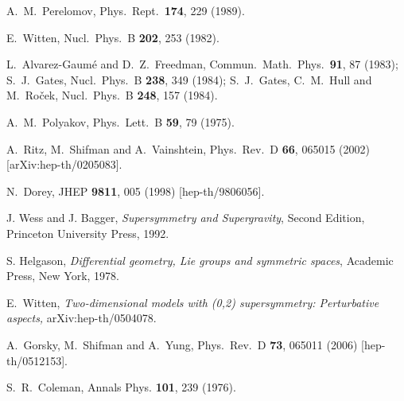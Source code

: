 \documentclass[epsfig,12pt]{article}
\newcommand{\cpn}{CP$(N-1)\,$}
\begin{document}
{\begin{thebibliography}{99}
 A.~M.~Perelomov,
  Phys.\ Rept.\  {\bf 174}, 229 (1989).
  
  E.~Witten,
  Nucl.\ Phys.\  B {\bf 202}, 253 (1982).
  
 L.~Alvarez-Gaum\'{e} and D.~Z.~Freedman,
Commun.\ Math.\ Phys.\  {\bf 91}, 87 (1983);
S.~J.~Gates,
Nucl.\ Phys.\ B {\bf 238}, 349 (1984);
S.~J.~Gates, C.~M.~Hull and M.~Ro\v{c}ek,
Nucl.\ Phys.\ B {\bf 248}, 157 (1984).

 A.~M.~Polyakov,
  Phys.\ Lett.\  B {\bf 59}, 79 (1975).
  
  A.~Ritz, M.~Shifman and A.~Vainshtein,
  Phys.\ Rev.\  D {\bf 66}, 065015 (2002)
  [arXiv:hep-th/0205083].
  
N.~Dorey,
JHEP {\bf 9811}, 005 (1998) [hep-th/9806056].
  
J. Wess and J. Bagger, {\em Supersymmetry and Supergravity}, Second Edition,
Princeton University Press, 1992.

S. Helgason, {\sl Differential geometry, Lie groups and symmetric spaces},
Academic Press, New York, 1978.

  E.~Witten,
{\em Two-dimensional models with (0,2) supersymmetry: Perturbative aspects,}
  arXiv:hep-th/0504078.
  
A.~Gorsky, M.~Shifman and A.~Yung,
Phys.\ Rev.\ D {\bf 73}, 065011 (2006)
[hep-th/0512153].

S.~R.~Coleman,
Annals Phys.  {\bf 101}, 239 (1976).


\end{thebibliography}}
\end{document}
